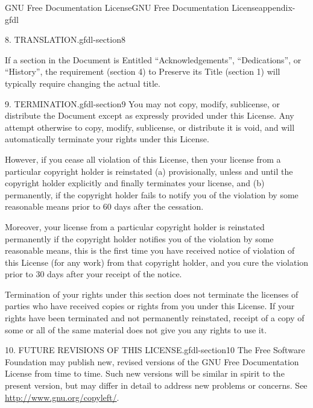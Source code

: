 \documentclass[oneside,10pt,]{book}
\numberwithin{equation}{section}
\begin{document}
\begin{appendixptx}{GNU Free Documentation License}{}{GNU Free Documentation License}{}{}{appendix-gfdl}
\begin{paragraphs}{8. TRANSLATION.}{gfdl-section8}
\par
\hypertarget{p-750}{}%
If a section in the Document is Entitled ``Acknowledgements'', ``Dedications'', or ``History'', the requirement (section 4) to Preserve its Title (section 1) will typically require changing the actual title.%
\end{paragraphs}%
\begin{paragraphs}{9. TERMINATION.}{gfdl-section9}%
\hypertarget{p-751}{}%
You may not copy, modify, sublicense, or distribute the Document except as expressly provided under this License. Any attempt otherwise to copy, modify, sublicense, or distribute it is void, and will automatically terminate your rights under this License.%
\par
\hypertarget{p-752}{}%
However, if you cease all violation of this License, then your license from a particular copyright holder is reinstated (a) provisionally, unless and until the copyright holder explicitly and finally terminates your license, and (b) permanently, if the copyright holder fails to notify you of the violation by some reasonable means prior to 60 days after the cessation.%
\par
\hypertarget{p-753}{}%
Moreover, your license from a particular copyright holder is reinstated permanently if the copyright holder notifies you of the violation by some reasonable means, this is the first time you have received notice of violation of this License (for any work) from that copyright holder, and you cure the violation prior to 30 days after your receipt of the notice.%
\par
\hypertarget{p-754}{}%
Termination of your rights under this section does not terminate the licenses of parties who have received copies or rights from you under this License. If your rights have been terminated and not permanently reinstated, receipt of a copy of some or all of the same material does not give you any rights to use it.%
\end{paragraphs}%
\begin{paragraphs}{10. FUTURE REVISIONS OF THIS LICENSE.}{gfdl-section10}%
\hypertarget{p-755}{}%
The Free Software Foundation may publish new, revised versions of the GNU Free Documentation License from time to time. Such new versions will be similar in spirit to the present version, but may differ in detail to address new problems or concerns. See \url{http://www.gnu.org/copyleft/}.%
\par
\hypertarget{p-756}{}%

\end{paragraphs}
\end{appendixptx}
\end{document}
